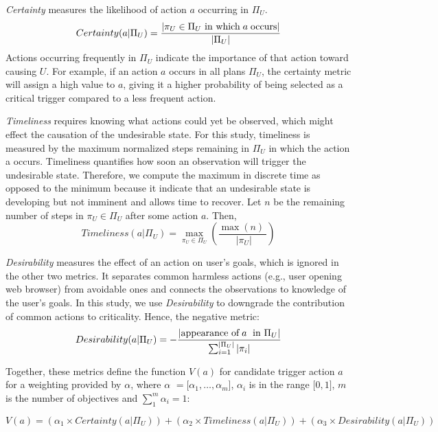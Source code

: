 {\it Certainty} measures the likelihood of action $a$ occurring in $\Pi_U$.
\begin{equation}
\label{eq:certainty}
Certainty (a|\Pi_U)  = \frac{|\pi_U \in \Pi_U \textup{ in which}\; a\; \textup{occurs}|}{|\Pi_U|}
\end{equation}
Actions occurring frequently in $\Pi_U$ indicate the importance of that action toward causing $U$. For example, if an action $a$ occurs in all plans $\Pi_U$, the certainty metric will assign a high value to $a$, giving it a higher probability of being selected as a critical trigger compared to a less frequent action. 

{\it Timeliness} requires knowing what actions could yet be observed, which might effect the causation of the undesirable state. For this study, timeliness is measured by the maximum normalized steps remaining in $\Pi_U$ in which the action a occurs. Timeliness quantifies how soon an observation will trigger the undesirable state. Therefore, we compute the maximum in discrete time as opposed to the minimum because it indicate that an undesirable state is developing but not imminent and allows time to recover. Let $n$ be the remaining number of steps in $\pi_U \in \Pi_U$ after some action $a$. Then,
\begin{equation}
\label{eq:timeliness}
Timeliness (a|\Pi_U) = \max_{\pi_U \in \Pi_U}\left(\frac{
	\max\left( n \right)\
	}{\; |\pi_U|}\right) 
\end{equation}

{\it Desirability} measures the effect of an action on user's goals, which is ignored in the other two metrics. It separates common harmless actions (e.g., user opening web browser) from avoidable ones and connects the observations to knowledge of the user's goals. In this study, we use {\it Desirability}
to downgrade the contribution of common actions to criticality. Hence, the negative metric:
\begin{equation}
\label{eq:desirability}
Desirability (a|\Pi_U) = - \frac{|\textup{appearance of}\; a\; \textup{ in } \Pi_U|}{\sum_{i=1}^{|\Pi_U|}\left | \pi_i \right |}
\end{equation}

Together, these metrics define the function $V(a)$ for candidate trigger action $a$ for a weighting provided by $\alpha$, where $\alpha$ $=\lbrack\alpha_1, \ldots, \alpha_m \rbrack$, $\alpha_i$ is in the range $\lbrack0,1\rbrack$, $m$ is the number of objectives and $\sum_{1}^{m}\alpha_i = 1$:

\begin{equation}
\label{eq:function}
V(a) = (\alpha_1 \times Certainty (a|\Pi_U)) + (\alpha_2 \times Timeliness (a|\Pi_U)) + (\alpha_3 \times Desirability (a|\Pi_U))
\end{equation}


